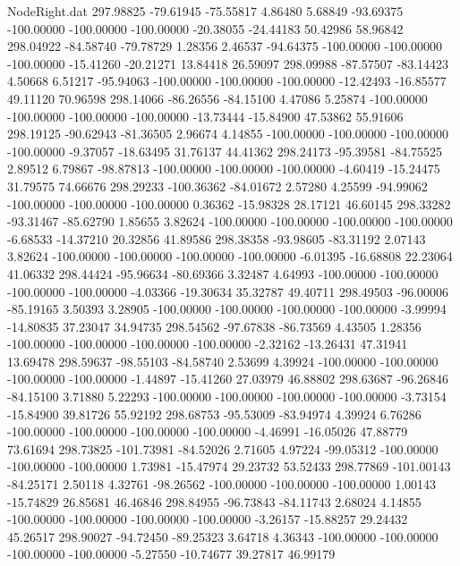 \begin{filecontents}{NodeRight.dat}
 297.98825  -79.61945  -75.55817     4.86480    5.68849  -93.69375 -100.00000 -100.00000 -100.00000  -20.38055  -24.44183   50.42986   58.96842
 298.04922  -84.58740  -79.78729     1.28356    2.46537  -94.64375 -100.00000 -100.00000 -100.00000  -15.41260  -20.21271   13.84418   26.59097
 298.09988  -87.57507  -83.14423     4.50668    6.51217  -95.94063 -100.00000 -100.00000 -100.00000  -12.42493  -16.85577   49.11120   70.96598
 298.14066  -86.26556  -84.15100     4.47086    5.25874 -100.00000 -100.00000 -100.00000 -100.00000  -13.73444  -15.84900   47.53862   55.91606
 298.19125  -90.62943  -81.36505     2.96674    4.14855 -100.00000 -100.00000 -100.00000 -100.00000   -9.37057  -18.63495   31.76137   44.41362
 298.24173  -95.39581  -84.75525     2.89512    6.79867  -98.87813 -100.00000 -100.00000 -100.00000   -4.60419  -15.24475   31.79575   74.66676
 298.29233 -100.36362  -84.01672     2.57280    4.25599  -94.99062 -100.00000 -100.00000 -100.00000    0.36362  -15.98328   28.17121   46.60145
 298.33282  -93.31467  -85.62790     1.85655    3.82624 -100.00000 -100.00000 -100.00000 -100.00000   -6.68533  -14.37210   20.32856   41.89586
 298.38358  -93.98605  -83.31192     2.07143    3.82624 -100.00000 -100.00000 -100.00000 -100.00000   -6.01395  -16.68808   22.23064   41.06332
 298.44424  -95.96634  -80.69366     3.32487    4.64993 -100.00000 -100.00000 -100.00000 -100.00000   -4.03366  -19.30634   35.32787   49.40711
 298.49503  -96.00006  -85.19165     3.50393    3.28905 -100.00000 -100.00000 -100.00000 -100.00000   -3.99994  -14.80835   37.23047   34.94735
 298.54562  -97.67838  -86.73569     4.43505    1.28356 -100.00000 -100.00000 -100.00000 -100.00000   -2.32162  -13.26431   47.31941   13.69478
 298.59637  -98.55103  -84.58740     2.53699    4.39924 -100.00000 -100.00000 -100.00000 -100.00000   -1.44897  -15.41260   27.03979   46.88802
 298.63687  -96.26846  -84.15100     3.71880    5.22293 -100.00000 -100.00000 -100.00000 -100.00000   -3.73154  -15.84900   39.81726   55.92192
 298.68753  -95.53009  -83.94974     4.39924    6.76286 -100.00000 -100.00000 -100.00000 -100.00000   -4.46991  -16.05026   47.88779   73.61694
 298.73825 -101.73981  -84.52026     2.71605    4.97224  -99.05312 -100.00000 -100.00000 -100.00000    1.73981  -15.47974   29.23732   53.52433
 298.77869 -101.00143  -84.25171     2.50118    4.32761  -98.26562 -100.00000 -100.00000 -100.00000    1.00143  -15.74829   26.85681   46.46846
 298.84955  -96.73843  -84.11743     2.68024    4.14855 -100.00000 -100.00000 -100.00000 -100.00000   -3.26157  -15.88257   29.24432   45.26517
 298.90027  -94.72450  -89.25323     3.64718    4.36343 -100.00000 -100.00000 -100.00000 -100.00000   -5.27550  -10.74677   39.27817   46.99179

\end{filecontents}
